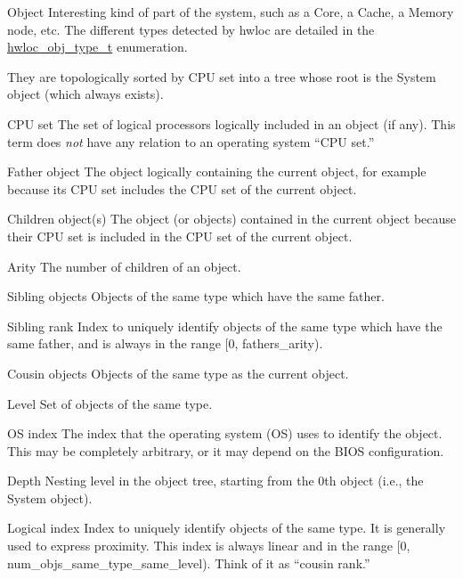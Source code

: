\begin{DoxyDescription}
\item[Object ]Interesting kind of part of the system, such as a Core, a Cache, a Memory node, etc. The different types detected by hwloc are detailed in the \hyperlink{group__hwlocality__types_gacd37bb612667dc437d66bfb175a8dc55}{hwloc\_\-obj\_\-type\_\-t} enumeration.

They are topologically sorted by CPU set into a tree whose root is the System object (which always exists). 


\item[CPU set ]The set of logical processors logically included in an object (if any). This term does {\itshape not\/} have any relation to an operating system ``CPU set.''


\item[Father object ]The object logically containing the current object, for example because its CPU set includes the CPU set of the current object.


\item[Children object(s) ]The object (or objects) contained in the current object because their CPU set is included in the CPU set of the current object.


\item[Arity ]The number of children of an object.


\item[Sibling objects ]Objects of the same type which have the same father.


\item[Sibling rank ]Index to uniquely identify objects of the same type which have the same father, and is always in the range \mbox{[}0, fathers\_\-arity).


\item[Cousin objects ]Objects of the same type as the current object.


\item[Level ]Set of objects of the same type.


\item[OS index ]The index that the operating system (OS) uses to identify the object. This may be completely arbitrary, or it may depend on the BIOS configuration.


\item[Depth ]Nesting level in the object tree, starting from the 0th object (i.e., the System object).


\item[Logical index ]Index to uniquely identify objects of the same type. It is generally used to express proximity. This index is always linear and in the range \mbox{[}0, num\_\-objs\_\-same\_\-type\_\-same\_\-level). Think of it as ``cousin rank.''


\end{DoxyDescription}

